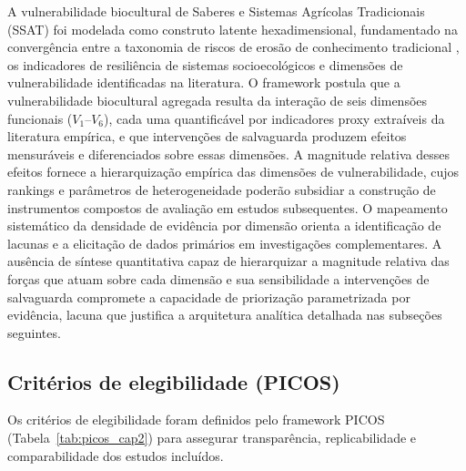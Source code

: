 A vulnerabilidade biocultural de Saberes e Sistemas Agrícolas Tradicionais (SSAT) foi modelada como construto latente hexadimensional, fundamentado na convergência entre a taxonomia de riscos de erosão de conhecimento tradicional \cite{Agrawal2002}, os indicadores de resiliência de sistemas socioecológicos \cite{Folke2016} e dimensões de vulnerabilidade identificadas na literatura. O framework postula que a vulnerabilidade biocultural agregada resulta da interação de seis dimensões funcionais ($V_1$--$V_6$), cada uma quantificável por indicadores proxy extraíveis da literatura empírica, e que intervenções de salvaguarda produzem efeitos mensuráveis e diferenciados sobre essas dimensões. A magnitude relativa desses efeitos fornece a hierarquização empírica das dimensões de vulnerabilidade, cujos rankings e parâmetros de heterogeneidade poderão subsidiar a construção de instrumentos compostos de avaliação em estudos subsequentes. O mapeamento sistemático da densidade de evidência por dimensão orienta a identificação de lacunas e a elicitação de dados primários em investigações complementares. A ausência de síntese quantitativa capaz de hierarquizar a magnitude relativa das forças que atuam sobre cada dimensão e sua sensibilidade a intervenções de salvaguarda compromete a capacidade de priorização parametrizada por evidência, lacuna que justifica a arquitetura analítica detalhada nas subseções seguintes.

\subsection{Critérios de elegibilidade (PICOS)}
\label{sec:picos_cap2}

Os critérios de elegibilidade foram definidos pelo framework PICOS (Tabela~\ref{tab:picos_cap2}) para assegurar transparência, replicabilidade e comparabilidade dos estudos incluídos.

